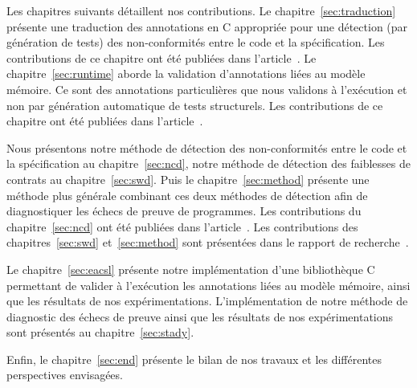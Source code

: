 Les chapitres suivants détaillent nos contributions.
Le chapitre~\ref{sec:traduction} présente une traduction des annotations \acsl
en C appropriée pour une détection (par génération de tests) des non-conformités
entre le code et la spécification.
Les contributions de ce chapitre ont été publiées dans
l'article~\cite{Petiot/SCAM14}.
Le chapitre~\ref{sec:runtime} aborde la validation d'annotations \acsl liées au
modèle mémoire.
Ce sont des annotations particulières que nous validons à l'exécution et non
par génération automatique de tests structurels.
Les contributions de ce chapitre ont été publiées dans
l'article~\cite{Kosmatov/RV13}.

Nous présentons notre méthode de détection des non-conformités entre le code et
la spécification au chapitre~\ref{sec:ncd}, notre méthode de détection des
faiblesses de contrats au chapitre~\ref{sec:swd}.
Puis le chapitre~\ref{sec:method} présente une méthode plus générale combinant
ces deux méthodes de détection afin de diagnostiquer les échecs de preuve de
programmes.
Les contributions du chapitre~\ref{sec:ncd} ont été publiées dans
l'article~\cite{Petiot/TAP14}.
Les contributions des chapitres~\ref{sec:swd} et~\ref{sec:method} sont
présentées dans le rapport de recherche~\cite{Petiot/unpublished15}.

Le chapitre~\ref{sec:eacsl} présente notre implémentation d'une bibliothèque C
permettant de valider à l'exécution les annotations \acsl liées au modèle
mémoire, ainsi que les résultats de nos expérimentations.
L'implémentation de notre méthode de diagnostic des échecs de preuve ainsi
que les résultats de nos expérimentations sont présentés au
chapitre~\ref{sec:stady}.

Enfin, le chapitre~\ref{sec:end} présente le bilan de nos travaux et les
différentes perspectives envisagées.
